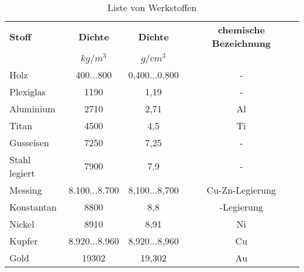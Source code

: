 \begin{table}[htb]
    \begin{tabular}{lccc}\toprule                   %
    \textbf{Stoff}	&\textbf{Dichte} &\textbf{Dichte} &\textbf{chemische Bezeichnung}	\\
                & \(kg/m^{3}\)	& \(g/cm^3\) 	& \\\midrule         %
    Holz		& 400...800	& 0,400...0,800	&- \\
    Plexiglas 	& 1190	& 1,19	& - 	\\
    Aluminium	& 2710	& 2,71	& Al	\\
    Titan		& 4500	& 4,5	& Ti	\\
    Gusseisen	& 7250	& 7,25	& - \\
    Stahl legiert& 7900	& 7,9	& - \\
    Messing		& 8.100...8.700	& 8,100...8,700	& Cu-Zn-Legierung\\
    Konstantan	& 8800	& 8,8	& \ch{Cu55Ni45}-Legierung\\
    Nickel		& 8910	& 8,91  & Ni \\
    Kupfer		& 8.920...8.960	& 8,920...8,960	& Cu\\
    Gold		& 19302	& 19,302& Au	\\\bottomrule               %
    \end{tabular}
    \caption{Liste von Werkstoffen}
    \label{tab:liste_der_werkstoffe}
\end{table}